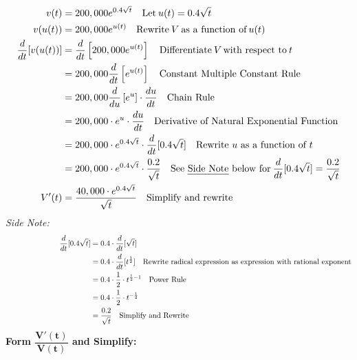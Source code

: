 \begin{example}
\begin{solL}
\begin{enumerate}[leftmargin=*]
\begin{displaymath}
        \begin{split}
            v(t)&=200,000e^{0.4\sqrt{t}} \quad \text{Let} \: u(t)=0.4\sqrt{t}\\
            v(u(t))&=200,000e^{u(t)}\quad \text{Rewrite}\: V \: \text{as a function of} \: u(t)\\
            \frac{d}{dt}[v(u(t))]&=\frac{d}{dt}\left[200,000e^{u(t)}\right]  \quad \text{Differentiate} \: V \,\text{with respect to}\: t\\
            &=200,000\frac{d}{dt}\left[e^{u(t)}\right]\quad \text{Constant Multiple Constant Rule}\\
            &=200,000\frac{d}{du}\left[e^{u}\right]\cdot \frac{du}{dt}\quad \text{Chain Rule}\\
            &=200,000\cdot e^{u}\cdot \frac{du}{dt}\quad \text{Derivative of Natural Exponential Function}\\
            &=200,000\cdot e^{0.4\sqrt{t}}\cdot \frac{d}{dt}[0.4\sqrt{t}] \quad \text{Rewrite $u$ as a function of $t$}\\
            &=200,000\cdot e^{0.4\sqrt{t}}\cdot \frac{0.2}{\sqrt{t}}\quad \text{See \emph{Side Note} below for}\: \frac{d}{dt}[0.4\sqrt{t}]=\frac{0.2}{\sqrt{t}}\\
            V'(t)&=\frac{40,000\cdot e^{0.4\sqrt{t}}}{\sqrt{t}} \quad \text{Simplify and rewrite}
        \end{split}
    \end{displaymath}
\emph{Side Note:}
\begin{displaymath}
        \begin{split}
            \hspace{2.5cm}\frac{d}{dt}[0.4\sqrt{t}]&=0.4\cdot\frac{d}{dt}[\sqrt{t}]\\
            &=0.4\cdot\frac{d}{dt}[t^{\frac{1}{2}}] \quad \text{Rewrite radical expression as expression with rational exponent}\\
            &=0.4\cdot \frac{1}{2}\cdot t^{\frac{1}{2}-1} \quad \text{Power Rule}\\
            &=0.4\cdot \frac{1}{2}\cdot t^{-\frac{1}{2}} \\
            &=\frac{0.2}{\sqrt{t}} \quad \text{Simplify and Rewrite}
        \end{split}
    \end{displaymath}
\textbf{Form  $\dfrac{\bm{V'(t)}}{\bm{V(t)}}$ and Simplify: }
\begin{displaymath}
    \begin{split}

\end{split}
\end{displaymath}
\end{enumerate}
\end{solL}
\end{example}
